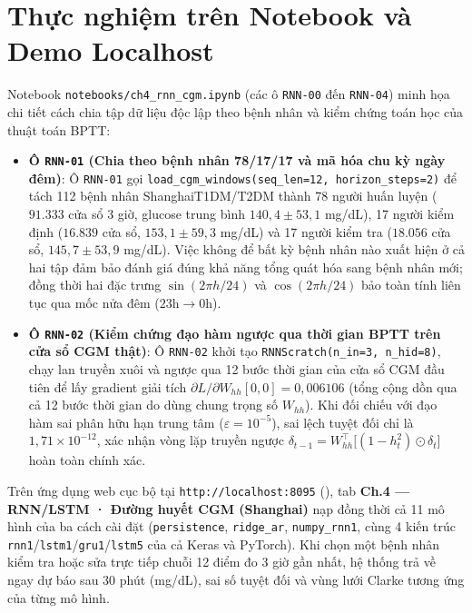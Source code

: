 \section{Thực nghiệm trên Notebook và Demo Localhost}
\label{sec:ch4-notebook-demo}

Notebook \texttt{notebooks/ch4\_rnn\_cgm.ipynb} (các ô \texttt{RNN-00} đến \texttt{RNN-04}) minh họa chi tiết cách chia tập dữ liệu độc lập theo bệnh nhân và kiểm chứng toán học của thuật toán BPTT:
\begin{itemize}
  \item \textbf{Ô \texttt{RNN-01} (Chia theo bệnh nhân 78/17/17 và mã hóa chu kỳ ngày đêm)}: Ô \texttt{RNN-01} gọi \texttt{load\_cgm\_windows(seq\_len=12, horizon\_steps=2)} để tách 112 bệnh nhân ShanghaiT1DM/T2DM thành 78 người huấn luyện ($91.333$ cửa sổ 3 giờ, glucose trung bình $140{,}4\pm 53{,}1$ mg/dL), 17 người kiểm định ($16.839$ cửa sổ, $153{,}1\pm 59{,}3$ mg/dL) và 17 người kiểm tra ($18.056$ cửa sổ, $145{,}7\pm 53{,}9$ mg/dL). Việc không để bất kỳ bệnh nhân nào xuất hiện ở cả hai tập đảm bảo đánh giá đúng khả năng tổng quát hóa sang bệnh nhân mới; đồng thời hai đặc trưng $\sin(2\pi h/24)$ và $\cos(2\pi h/24)$ bảo toàn tính liên tục qua mốc nửa đêm ($23\text{h}\to 0\text{h}$).
  \item \textbf{Ô \texttt{RNN-02} (Kiểm chứng đạo hàm ngược qua thời gian BPTT trên cửa sổ CGM thật)}: Ô \texttt{RNN-02} khởi tạo \texttt{RNNScratch(n\_in=3, n\_hid=8)}, chạy lan truyền xuôi và ngược qua 12 bước thời gian của cửa sổ CGM đầu tiên để lấy gradient giải tích $\partial L/\partial W_{hh}[0,0] = 0{,}006106$ (tổng cộng dồn qua cả 12 bước thời gian do dùng chung trọng số $W_{hh}$). Khi đối chiếu với đạo hàm sai phân hữu hạn trung tâm ($\varepsilon=10^{-5}$), sai lệch tuyệt đối chỉ là $1{,}71\times 10^{-12}$, xác nhận vòng lặp truyền ngược $\delta_{t-1} = W_{hh}^\top\big[(1-h_t^2)\odot\delta_t\big]$ hoàn toàn chính xác.
\end{itemize}

Trên ứng dụng web cục bộ tại \texttt{http://localhost:8095} (), tab \textbf{Ch.4 — RNN/LSTM · Đường huyết CGM (Shanghai)} nạp đồng thời cả 11 mô hình của ba cách cài đặt (\texttt{persistence}, \texttt{ridge\_ar}, \texttt{numpy\_rnn1}, cùng 4 kiến trúc \texttt{rnn1}/\texttt{lstm1}/\texttt{gru1}/\texttt{lstm5} của cả Keras và PyTorch). Khi chọn một bệnh nhân kiểm tra hoặc sửa trực tiếp chuỗi 12 điểm đo 3 giờ gần nhất, hệ thống trả về ngay dự báo sau 30 phút (mg/dL), sai số tuyệt đối và vùng lưới Clarke tương ứng của từng mô hình.



